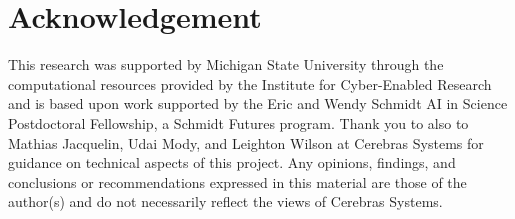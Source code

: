 \section*{Acknowledgement}

This research was supported by Michigan State University through the computational resources provided by the Institute for Cyber-Enabled Research and is based upon work supported by the Eric and Wendy Schmidt AI in Science Postdoctoral Fellowship, a Schmidt Futures program.
Thank you to also to Mathias Jacquelin, Udai Mody, and Leighton Wilson at Cerebras Systems for guidance on technical aspects of this project.
Any opinions, findings, and conclusions or recommendations expressed in this material are those of the author(s) and do not necessarily reflect the views of Cerebras Systems.
